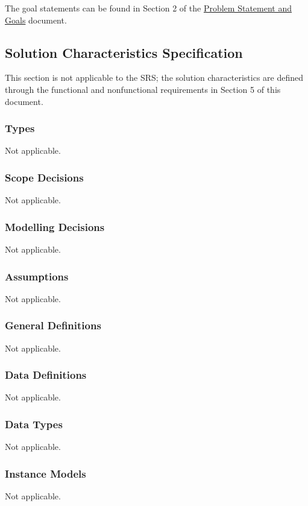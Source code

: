 \documentclass[12pt]{article}
\begin{document}
The goal statements can be found in Section 2 of the
\href{https://github.com/PlutosCapstone/Plutos/blob/main/docs/ProblemStatementAndGoals/ProblemStatement.pdf}{Problem
Statement and Goals} document.

\newpage


\subsection{Solution Characteristics Specification}
This section is not applicable to the SRS; the solution characteristics are
defined through the functional and nonfunctional requirements in Section 5 of
this document.

\subsubsection{Types}
Not applicable.

\subsubsection{Scope Decisions}
Not applicable.

\subsubsection{Modelling Decisions}
Not applicable.

\subsubsection{Assumptions} \label{sec_assumpt} Not applicable.

\subsubsection{General Definitions}\label{sec_gendef} Not applicable.

\subsubsection{Data Definitions}\label{sec_datadef} Not applicable.

\subsubsection{Data Types}\label{sec_datatypes} Not applicable.

\subsubsection{Instance Models} \label{sec_instance}    
Not applicable.
\end{document}

